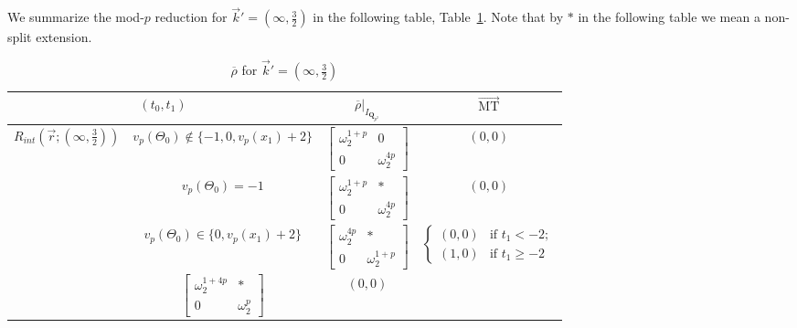 \documentclass[11pt]{amsart}
\theoremstyle{definition}
\numberwithin{equation}{subsection}
\theoremstyle{plain}
\theoremstyle{plain}
\theoremstyle{plain}
\theoremstyle{plain}
\theoremstyle{plain}
\theoremstyle{plain}
\theoremstyle{plain}
\theoremstyle{plain}
\theoremstyle{plain}
\theoremstyle{plain}
\theoremstyle{plain}
\theoremstyle{plain}
\theoremstyle{definition}
\theoremstyle{definition}
\theoremstyle{definition}
\theoremstyle{remark}
\renewcommand{\(}{\textup{(}}
\renewcommand{\)}{\textup{)}}
\newcommand{\Q}{\mathbf{Q}}
\newcommand{\rhobar}{\overline{\rho}}
\newcommand{\vr}{\vec{r}}
\newcommand{\vk}{\vec{k}}
\begin{document}
We summarize the mod-$p$ reduction for $\vk'=(\infty,\frac{3}{2})$ in the following table, Table~\ref{tab: (infty,3/2)}. Note that by $\ast$ in the following table we mean a non-split extension.
\begin{table}[htbp]%
  \centering
  \begin{tabular}{|c|c||c|c|}
    \hline
    \multicolumn{2}{|c||}{$(t_0,t_1)$} & $\rhobar|_{I_{\Q_{p^2}}}$ & $\vec{\mathrm{MT}}$ \\\hline\hline
    \multirow{5}{*}{$R_{int}(\vr;(\infty,\frac{3}{2}))$}
        & $v_p(\Theta_0)\not\in\{-1,0,v_p(x_1)+2\}$
        & $
        \begin{bmatrix}
          \omega_2^{1+p} & 0 \\
          0 & \omega_2^{4p}
        \end{bmatrix}$
        & $(0,0)$ \\\cline{2-4}
        & $v_p(\Theta_0)=-1$
        & $
        \begin{bmatrix}
          \omega_2^{1+p} & * \\
          0 & \omega_2^{4p}
        \end{bmatrix}$ & $(0,0)$ \\\cline{2-4}
        & $v_p(\Theta_0)\in\{0,v_p(x_1)+2\}$
        & $
        \begin{bmatrix}
          \omega_2^{4p} & * \\
          0 & \omega_2^{1+p}
        \end{bmatrix}$
        & $
        \begin{cases}
          (0,0) & \mbox{if } t_1<-2; \\
          (1,0) & \mbox{if } t_1\geq -2
        \end{cases}$ \\\hline
    \multicolumn{2}{|c||}{$t_1=-3$}
        & $
        \begin{bmatrix}
          \omega_2^{1+4p} & * \\
          0 & \omega_2^p
        \end{bmatrix}$ & $(0,0)$ \\\hline
  \end{tabular}
  \caption{$\rhobar$ for $\vk'=(\infty,\frac{3}{2})$}\label{tab: (infty,3/2)}
\end{table}
\end{document}
